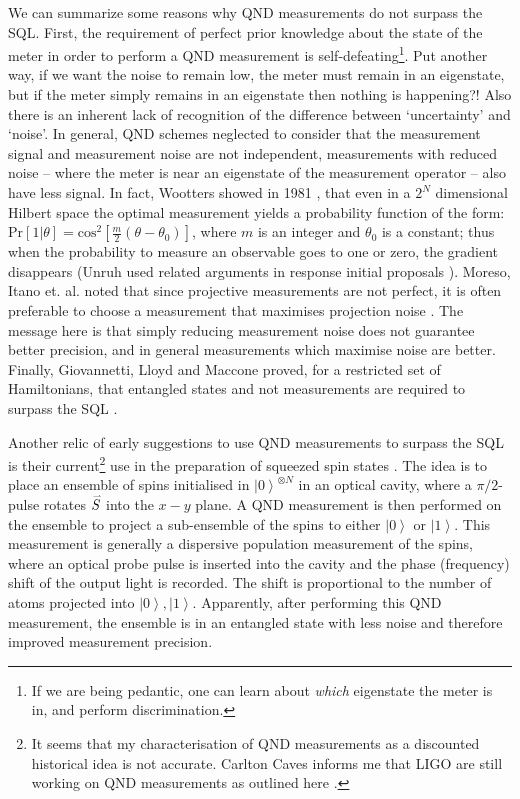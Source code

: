 \documentclass[reqno]{amsart}
\newcommand{\ket}[1]{\left| #1 \right>}
\newcommand{\myvec}[1]{\accentset{\rightharpoonup}{#1}}
\def\func#1#2{\mathrm{#1}\left[#2\right]}
\begin{document}
We can summarize some reasons why QND measurements do not surpass the SQL. First, the requirement of perfect prior knowledge about the state of the meter in order to perform a QND measurement is self-defeating\footnote{If we are being pedantic, one can learn about \emph{which} eigenstate the meter is in, and perform discrimination.}. Put another way, if we want the noise to remain low, the meter must remain in an eigenstate, but if the meter simply remains in an eigenstate then nothing is happening?! Also there is an inherent lack of recognition of the difference between `uncertainty' and `noise'. In general, QND schemes neglected to consider that the measurement signal and measurement noise are not independent, measurements with reduced noise -- where the meter is near an eigenstate of the measurement operator -- also have less signal. In fact, Wootters showed in 1981 \cite{Wootters1981}, that even in a $2^N$ dimensional Hilbert space the optimal measurement yields a probability function of the form: $\func{Pr}{1|\theta} = \func{cos^2}{\frac{m}{2}(\theta - \theta_0)}$, where $m$ is an integer and $\theta_0$ is a constant; thus when the probability to measure an observable goes to one or zero, the gradient disappears (Unruh used related arguments in response initial proposals \cite{Unruh1978}). Moreso, Itano et. al. noted that since projective measurements are not perfect, it is often preferable to choose a measurement that maximises projection noise \cite{Itano1993}. The message here is that simply reducing measurement noise does not guarantee better precision, and in general measurements which maximise noise are better. Finally, Giovannetti, Lloyd and Maccone proved, for a restricted set of Hamiltonians, that entangled states and not measurements are required to surpass the SQL \cite{Giovannetti2006}.

Another relic of early suggestions to use QND measurements to surpass the SQL is their current\footnote{It seems that my characterisation of QND measurements as a discounted historical idea is not accurate. Carlton Caves informs me that LIGO are still working on QND measurements as outlined here \cite{Kimble2001}.} use in the preparation of squeezed spin states \cite{Kuzmich2000, Appel2009,  Koschorreck2010, LouchetChauvet2010, SchleierSmith2010, Sewell2012, Bohnet2014, Cox2016, Hosten2016, Hosten2016a, Braverman2019, Malia2020, Greve2022, Malia2022}. The idea is to place an ensemble of spins initialised in $\ket{0}^{\otimes N}$ in an optical cavity, where a $\pi/2$-pulse rotates $\myvec{S}$ into the $x - y$ plane. A QND measurement is then performed on the ensemble to project a sub-ensemble of the spins to either $\ket{0}$ or $\ket{1}$. This measurement is generally a dispersive population measurement of the spins, where an optical probe pulse is inserted into the cavity and the phase (frequency) shift of the output light is recorded. The shift is proportional to the number of atoms projected into $\ket{0},\ket{1}$. Apparently, after performing this QND measurement, the ensemble is in an entangled state with less noise and therefore improved measurement precision.
\end{document}
